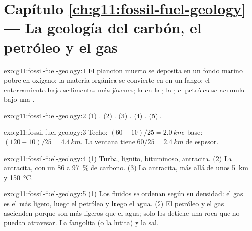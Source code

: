 \section*{Capítulo \ref{ch:g11:fossil-fuel-geology} --- La geología del carbón, el petróleo y el gas}

\begin{solution}{exo:g11:fossil-fuel-geology:1}
El plancton muerto se deposita en un fondo marino pobre en oxígeno; la
materia orgánica se convierte en  en un fango; el enterramiento bajo
sedimentos más jóvenes; la  en la ; la
; el petróleo se acumula bajo una .
\end{solution}

\begin{solution}{exo:g11:fossil-fuel-geology:2}
(1) . (2) . (3) . (4) . (5) .
\end{solution}

\begin{solution}{exo:g11:fossil-fuel-geology:3}
Techo: $(60 - 10)/25 = \qty{2.0}{km}$; base: $(120 - 10)/25 = \qty{4.4}{km}$.
La ventana tiene $60/25 = \qty{2.4}{km}$ de espesor.
\end{solution}

\begin{solution}{exo:g11:fossil-fuel-geology:4}
(1) Turba, lignito,  bituminoso, antracita. (2) La antracita, con un 86
a \qty{97}{\percent} de carbono. (3) La antracita, más allá de unos
\qty{5}{km} y \qty{150}{\degreeCelsius}.
\end{solution}

\begin{solution}{exo:g11:fossil-fuel-geology:5}
(1) Los fluidos se ordenan según su densidad: el gas es el más ligero, luego
el petróleo y luego el agua. (2) El petróleo y el gas ascienden porque son
más ligeros que el agua; solo los detiene una roca que no puedan atravesar.
La fangolita (o la lutita) y la sal.
\end{solution}

